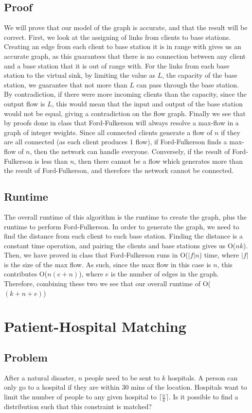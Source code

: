 \documentclass[titlepage]{article}
\begin{document}
\subsection{Proof}
We will prove that our model of the graph is accurate, and that the result will be correct. First, we look at the assigning of links from
clients to base stations. Creating an edge from each client to base station it is in range with gives us an accurate graph, as this guarantees
that there is no connection between any client and a base station that it is out of range with. For the links from each base station to the
virtual sink, by limiting the value as $L$, the capacity of the base station, we guarantee that not more than $L$ can pass through the
base station. By contradiction, if there were more incoming clients than the capacity, since the output flow is $L$, this would mean that
the input and output of the base station would not be equal, giving a contradiction on the flow graph. Finally we see that by proofs done
in class that Ford-Fulkerson will always resolve a max-flow in a graph of integer weights. Since all connected clients generate a flow of
$n$ if they are all connected (as each client produces 1 flow), if Ford-Fulkerson finds a max-flow of $n$, then the network can handle everyone.
Conversely, if the result of Ford-Fulkerson is less than $n$, then there cannot be a flow which generates more than the result of Ford-Fulkerson,
and therefore the network cannot be connected.
\subsection{Runtime}
The overall runtime of this algorithm is the runtime to create the graph, plus the runtime to perform Ford-Fulkerson. In order to generate the
graph, we need to find the distance from each client to each base station. Finding the distance is a constant time operation, and pairing the
clients and base stations gives us O($nk$). Then, we have proved in class that Ford-Fulkerson runs in O($|f|n$) time, where $|f|$ is the size
of the max flow. As such, since the max flow in this case is $n$, this contributes O($n(e+n)$), where $e$ is the number of edges in the graph.
Therefore, combining these two we see that our overall runtime of O($(k+n+e)$)

\section{Patient-Hospital Matching}
\subsection{Problem}
After a natural disaster, $n$ people need to be sent to $k$ hospitals. A person can only go to a hospital if they are within 30 mins of the
location. Hospitals want to limit the number of people to any given hospital to $\lceil\frac{n}{k}\rceil$. Is it possible to find a
distribution such that this constraint is matched?
\end{document}
